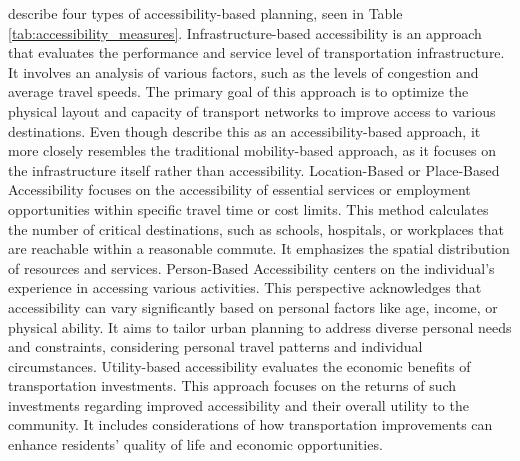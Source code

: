  describe four types of accessibility-based planning, seen in Table \ref{tab:accessibility_measures}.
Infrastructure-based accessibility is an approach that evaluates the performance and service level of transportation infrastructure.
It involves an analysis of various factors, such as the levels of congestion and average travel speeds. 
The primary goal of this approach is to optimize the physical layout and capacity of transport networks to improve access to various destinations.
Even though  describe this as an accessibility-based approach, it more closely resembles the traditional mobility-based approach, as it focuses on the infrastructure itself rather than accessibility.
Location-Based or Place-Based Accessibility focuses on the accessibility of essential services or employment opportunities within specific travel time or cost limits. 
This method calculates the number of critical destinations, such as schools, hospitals, or workplaces that are reachable within a reasonable commute. It emphasizes the spatial distribution of resources and services.
Person-Based Accessibility centers on the individual's experience in accessing various activities. This perspective acknowledges that accessibility can vary significantly based on personal factors like age, income, or physical ability. It aims to tailor urban planning to address diverse personal needs and constraints, considering personal travel patterns and individual circumstances.
Utility-based accessibility evaluates the economic benefits of transportation investments. 
This approach focuses on the returns of such investments regarding improved accessibility and their overall utility to the community. 
It includes considerations of how transportation improvements can enhance residents' quality of life and economic opportunities.

